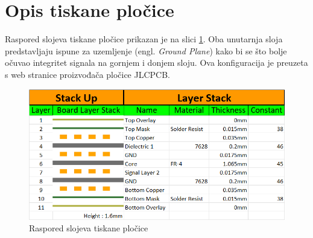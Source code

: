 \section{Opis tiskane pločice}
Raspored slojeva tiskane pločice prikazan je na slici \ref{slk:MB_BOARD_STACKUP}. Oba unutarnja sloja predstavljaju ispune za uzemljenje (engl. \textit{Ground Plane}) kako bi se što bolje očuvao integritet signala na gornjem i donjem sloju. Ova konfiguracija je preuzeta s web stranice proizvođača pločice JLCPCB.
\begin{figure}[htb]
    \centering
    \includegraphics[width=10 cm]{Figures/MB_BOARD_STACKUP.png}
    \caption{Raspored slojeva tiskane pločice}
    \label{slk:MB_BOARD_STACKUP}
\end{figure}

